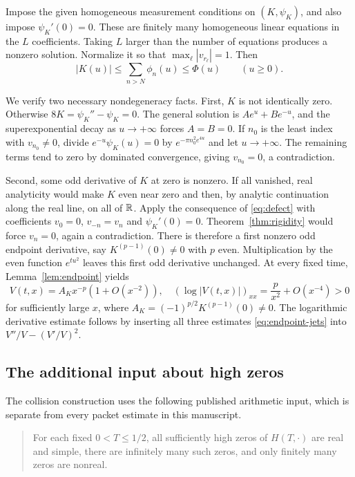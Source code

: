 Impose the given homogeneous measurement conditions on $(K,\psi_K)$,
and also impose $\psi_K'(0)=0$. These are finitely many homogeneous
linear equations in the $L$ coefficients. Taking $L$ larger than the
number of equations produces a nonzero solution. Normalize it so that
$\max_\ell|v_{r_\ell}|=1$. Then
\begin{equation}\label{eq:K-majorant}
 |K(u)|\le\sum_{n>N}\phi_n(u)\le\Phi(u)\qquad(u\ge0).
\end{equation}

We verify two necessary nondegeneracy facts. First, $K$ is not identically
zero. Otherwise $8K=\psi_K''-\psi_K=0$. The general solution is
$Ae^u+Be^{-u}$, and the superexponential decay as $u\to+\infty$ forces
$A=B=0$. If $n_0$ is the least index with $v_{n_0}\ne0$, divide
$e^{-u}\psi_K(u)=0$ by $e^{-\pi n_0^2e^{4u}}$ and let $u\to+\infty$.
The remaining terms tend to zero by dominated convergence, giving
$v_{n_0}=0$, a contradiction.

Second, some odd derivative of $K$ at zero is nonzero. If all vanished,
real analyticity would make $K$ even near zero and then, by analytic
continuation along the real line, on all of $\mathbb R$. Apply the consequence
of \eqref{eq:defect} with coefficients $v_0=0$, $v_{-n}=v_n$ and
$\psi_K'(0)=0$. Theorem~\ref{thm:rigidity} would force $v_n=0$, again a
contradiction. There is therefore a first nonzero odd endpoint derivative,
say $K^{(p-1)}(0)\ne0$ with $p$ even. Multiplication by the even function
$e^{tu^2}$ leaves this first odd derivative unchanged. At every fixed
time, Lemma~\ref{lem:endpoint} yields
\begin{equation}\label{eq:control-tail}
 V(t,x)=A_Kx^{-p}(1+O(x^{-2})),\quad
 (\log|V(t,x)|)_{xx}=\frac p{x^2}+O(x^{-4})>0
\end{equation}
for sufficiently large $x$, where $A_K=(-1)^{p/2}K^{(p-1)}(0)\ne0$.
The logarithmic derivative estimate follows by inserting all three
estimates \eqref{eq:endpoint-jets} into $V''/V-(V'/V)^2$.

\subsection{The additional input about high zeros}

The collision construction uses the following published arithmetic input,
which is separate from every packet estimate in this manuscript.

\begin{quote}
For each fixed $0<T\le1/2$, all sufficiently high zeros of
$H(T,\cdot)$ are real and simple, there are infinitely many such zeros,
and only finitely many zeros are nonreal.
\end{quote}


